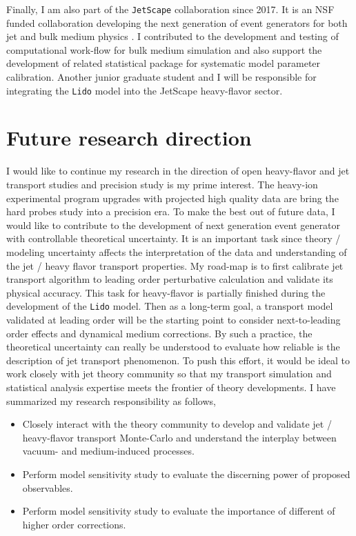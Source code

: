 \documentclass[12pt,a4paper]{article}
\begin{document}
Finally, I am also part of the {\tt JetScape} collaboration since 2017. 
It is an NSF funded collaboration developing the next generation of event generators for both jet and bulk medium physics \cite{JetScape}. 
I contributed to the development and testing of computational work-flow for bulk medium simulation and also support the development of related statistical package for systematic model parameter calibration.
Another junior graduate student and I will be responsible for integrating the {\tt Lido} model into the JetScape heavy-flavor sector.

\section{Future research direction}
I would like to continue my research in the direction of open heavy-flavor and jet transport studies and precision study is my prime interest. 
The heavy-ion experimental program upgrades with projected high quality data are bring the hard probes study into a precision era. 
To make the best out of future data, I would like to contribute to the development of next generation event generator with controllable theoretical uncertainty.
It is an important task since theory / modeling uncertainty affects the interpretation of the data and understanding of the jet / heavy flavor transport properties.
My road-map is to first calibrate jet transport algorithm to leading order perturbative calculation and validate its physical accuracy. 
This task for heavy-flavor is partially finished during the development of the {\tt Lido} model.
Then as a long-term goal, a transport model validated at leading order will be the starting point to consider next-to-leading order effects and dynamical medium corrections.
By such a practice, the theoretical uncertainty can really be understood to evaluate how reliable is the description of jet transport phenomenon.
To push this effort, it would be ideal to work closely with jet theory community so that my transport simulation and statistical analysis expertise meets the frontier of theory developments. 
I have summarized my research responsibility as follows,
\begin{itemize}
\item Closely interact with the theory community to develop and validate jet / heavy-flavor transport Monte-Carlo and understand the interplay between vacuum- and medium-induced processes.
\item Perform model sensitivity study to evaluate the discerning power of proposed observables.
\item Perform model sensitivity study to evaluate the importance of different of higher order corrections.
\end{itemize} 
\end{document}
